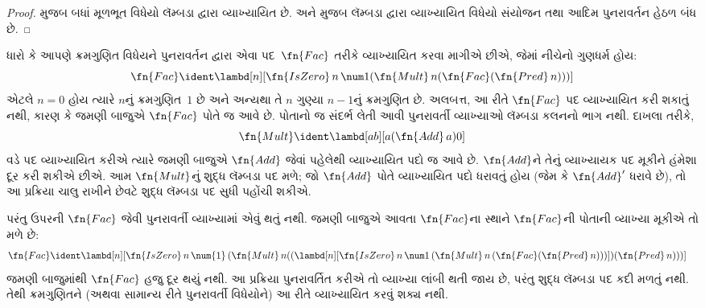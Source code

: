 \begin{proof}
   મુજબ બધાં મૂળભૂત વિધેયો
  લૅમ્બડા દ્વારા વ્યાખ્યાયિત છે. 
  અને  મુજબ
  લૅમ્બડા દ્વારા વ્યાખ્યાયિત વિધેયો સંયોજન તથા
  આદિમ પુનરાવર્તન હેઠળ બંધ છે.
\end{proof}
\endgroup

\begingroup
\makeatletter{}\makeatother


\label{guunit:OLP-0379}


ધારો કે આપણે ક્રમગુણિત વિધેયને પુનરાવર્તન દ્વારા એવા
પદ~$\fn{Fac}$ તરીકે વ્યાખ્યાયિત કરવા માગીએ છીએ, જેમાં નીચેનો ગુણધર્મ હોય:
\[
\fn{Fac} \ident \lambd[n][\fn{IsZero}\, n\, \num 1 (\fn{Mult}\, n (\fn{Fac}(\fn{Pred} \, n)))]
\]
એટલે $n=0$ હોય ત્યારે $n$નું ક્રમગુણિત~$1$ છે અને
અન્યથા તે $n$ ગુણ્યા $n-1$નું ક્રમગુણિત છે. અલબત્ત, આ રીતે
$\fn{Fac}$ પદ વ્યાખ્યાયિત કરી શકાતું નથી, કારણ કે જમણી બાજુએ
$\fn{Fac}$ પોતે જ આવે છે. પોતાનો જ સંદર્ભ લેતી આવી
પુનરાવર્તી વ્યાખ્યાઓ લૅમ્બડા કલનનો ભાગ નથી. દાખલા તરીકે,
\[
\fn{Mult} \ident \lambd[ab][a (\fn{Add}\, a) 0]
\]
વડે પદ વ્યાખ્યાયિત કરીએ ત્યારે જમણી બાજુએ $\fn{Add}$ જેવાં
પહેલેથી વ્યાખ્યાયિત પદો જ આવે છે. $\fn{Add}$ને તેનું વ્યાખ્યાયક
પદ મૂકીને હંમેશા દૂર કરી શકીએ છીએ. આમ $\fn{Mult}$નું
શુદ્ધ લૅમ્બડા પદ મળે; જો $\fn{Add}$ પોતે વ્યાખ્યાયિત પદો
ધરાવતું હોય (જેમ કે $\fn{Add}'$ ધરાવે છે), તો આ પ્રક્રિયા
ચાલુ રાખીને છેવટે શુદ્ધ લૅમ્બડા પદ સુધી પહોંચી શકીએ.

પરંતુ ઉપરની $\fn{Fac}$ જેવી પુનરાવર્તી વ્યાખ્યામાં એવું થતું
નથી. જમણી બાજુએ આવતા $\fn{Fac}$ના સ્થાને
$\fn{Fac}$ની પોતાની વ્યાખ્યા મૂકીએ તો મળે છે:
\begin{align*}
  \fn{Fac} & \ident \lambd[n][\fn{IsZero}\, n\, \num{1}\,
    (\fn{Mult}\, n
  ((\lambd[n][\fn{IsZero} \, n \, \num 1\, (\fn{Mult}\, n\, (\fn{Fac}
    (\fn{Pred}\, n)))]) (\fn{Pred}\, n)))]
\end{align*}
જમણી બાજુમાંથી $\fn{Fac}$ હજુ દૂર થયું નથી. આ પ્રક્રિયા
પુનરાવર્તિત કરીએ તો વ્યાખ્યા લાંબી થતી જાય છે, પરંતુ
શુદ્ધ લૅમ્બડા પદ કદી મળતું નથી. તેથી ક્રમગુણિતને
(અથવા સામાન્ય રીતે પુનરાવર્તી વિધેયોને) આ રીતે વ્યાખ્યાયિત
કરવું શક્ય નથી.

